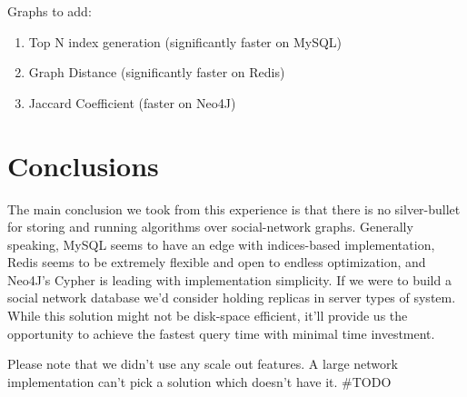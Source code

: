 Graphs to add:
\begin{enumerate}
\item Top N index generation (significantly faster on MySQL)
\item Graph Distance (significantly faster on Redis)
\item Jaccard Coefficient (faster on Neo4J)
\end{enumerate}

\section{Conclusions}
The main conclusion we took from this experience is that there is no silver-bullet for storing and running algorithms over social-network graphs. Generally speaking, MySQL seems to have an edge with indices-based implementation, Redis seems to be extremely flexible and open to endless optimization, and Neo4J's Cypher is leading with implementation simplicity.
If we were to build a social network database we'd consider holding replicas in server types of system. While this solution might not be disk-space efficient, it'll provide us the opportunity to achieve the fastest query time with minimal time investment.

Please note that we didn't use any scale out features. A large network implementation can't pick a solution which doesn't have it. \#TODO
